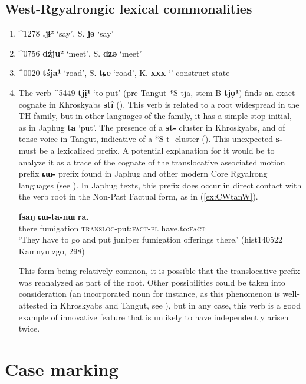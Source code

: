 \documentclass[oneside,a4paper,11pt]{article}
\newcommand{\ipa}[1]{{\phon\textbf{#1}}}
\newcommand{\wobzi}[2]{K. \ipa{#1} `#2'}
\newcommand{\stau}[2]{S. \ipa{#1} `#2'}
\newcommand{\tangut}[3]{\mo{#1}^{#1} \ipa{#2} `#3'}
\begin{document}
\subsection{West-Rgyalrongic lexical commonalities}
\begin{enumerate}
\item \tangut{1278}{.jɨ²}{say}, \stau{jə}{say}
\item \tangut{0756}{dźju²}{meet}, \stau{dʑə}{meet}
\item \tangut{0020}{tśja¹}{road}, \stau{tɕe}{road}, \wobzi{xxx}{} construct state
\item  The verb \tangut{5449}{tjị¹}{to put} (pre-Tangut *S-tja, stem B  \ipa{tjọ¹}) finds an exact cognate in Khroskyabs \ipa{stî} (\citealt{lai17khroskyabs}). This verb is related to a root widespread in the TH family, but in other languages of the family, it has a simple stop initial, as in Japhug \ipa{ta} `put'. The presence of a \ipa{st-} cluster in Khroskyabs, and of tense voice in Tangut, indicative of a *S-t- cluster (\citealt{gong99jinyuanyin}). This unexpected \ipa{s-} must be a lexicalized prefix. A potential explanation for it would be to analyze it as a trace of the cognate of the translocative associated motion prefix \ipa{ɕɯ-} prefix found in Japhug and other modern Core Rgyalrong languages (see \citealt{jacques13harmonization}). In Japhug texts, this prefix does occur in direct contact with the verb root in the Non-Past Factual form, as in (\ref{ex:CWtanW}).

\begin{exe}
\ex \label{ex:CWtanW}
\gll \ipa{nɯtɕu} 	\ipa{fsaŋ} 	\ipa{ɕɯ-ta-nɯ} 	\ipa{ra.}  \\
 there fumigation \textsc{transloc}-put:\textsc{fact-pl} have.to:\textsc{fact} \\
 \glt `They have to go and put juniper fumigation offerings there.' (hist140522 Kamnyu zgo, 298)
\end{exe}

This form being relatively common, it is possible that the translocative prefix was reanalyzed as part of the root. Other possibilities could be taken into consideration (an incorporated noun for instance, as this phenomenon is well-attested in Khroskyabs and Tangut, see \citealt{jacques11tangut.verb}), but in any case, this verb is a good example of innovative feature that is unlikely to have independently arisen twice.
\end{enumerate}
\section{Case marking} 
\citet{jacques17stau}
\end{document}
